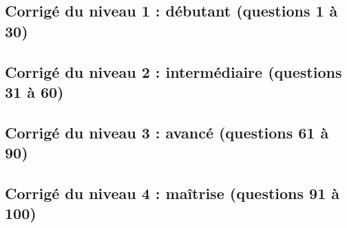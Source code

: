 \clearpage
\subsection{Corrigé du niveau 1 : débutant (questions 1 à 30)}\label{sec:qcm-c1}

\clearpage
\subsection{Corrigé du niveau 2 : intermédiaire (questions 31 à 60)}\label{sec:qcm-c2}

\clearpage
\subsection{Corrigé du niveau 3 : avancé (questions 61 à 90)}\label{sec:qcm-c3}

\clearpage
\subsection{Corrigé du niveau 4 : maîtrise (questions 91 à 100)}\label{sec:qcm-c4}
\fi
